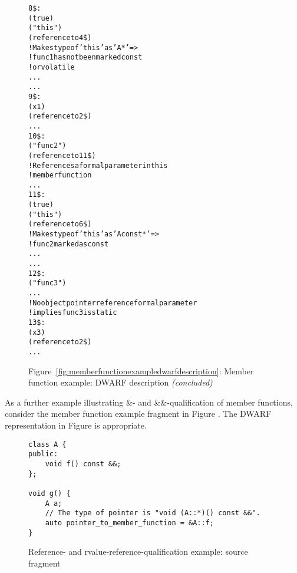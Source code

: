 \begin{figure}[p]
\begin{dwflisting}
\begin{alltt}

8\$:         \DWTAGformalparameter
                \DWATartificial(true)
                \DWATname("this")
                \DWATtype(reference to 4\$)
                    ! Makes type of 'this' as 'A*' =>
                    ! func1 has not been marked const 
                    ! or volatile
                \DWATlocation ...
                ...
9\$:         \DWTAGformalparameter
                \DWATname(x1)
                \DWATtype(reference to 2\$)
                ...
10\$:    \DWTAGsubprogram
            \DWATdeclaration
            \DWATname("func2")
            \DWATobjectpointer(reference to 11\$) 
            ! References a formal parameter in this 
            ! member function
            ...
11\$:        \DWTAGformalparameter
                \DWATartificial(true)
                \DWATname("this")
                \DWATtype(reference to 6\$)
                ! Makes type of 'this' as 'A const*' =>
                !     func2 marked as const
                \DWATlocation ...
                ...
12\$:    \DWTAGsubprogram
            \DWATdeclaration
            \DWATname("func3")
            ...
                ! No object pointer reference formal parameter
                ! implies func3 is static
13\$:        \DWTAGformalparameter
                \DWATname(x3)
                \DWATtype(reference to 2\$)
                ...

\end{alltt}
\end{dwflisting}
\begin{center}
\vspace{3mm}
Figure~\ref{fig:memberfunctionexampledwarfdescription}: Member function example: DWARF description \textit{(concluded)}
\end{center}
\end{figure}

\clearpage
As a further example illustrating \&- and \&\&-qualification
of member functions, 
consider the member function example fragment in 
Figure .
The DWARF representation in 
Figure 
is appropriate.

\begin{figure}[ht]
\begin{lstlisting}
class A {
public:
    void f() const &&;
};
   
void g() {
    A a;
    // The type of pointer is "void (A::*)() const &&".
    auto pointer_to_member_function = &A::f;
}
\end{lstlisting}
\caption{Reference- and rvalue-reference-qualification example: source \mbox{fragment}}
\label{fig:memberfunctionrefqualexamplesourcefragment}
\end{figure}

